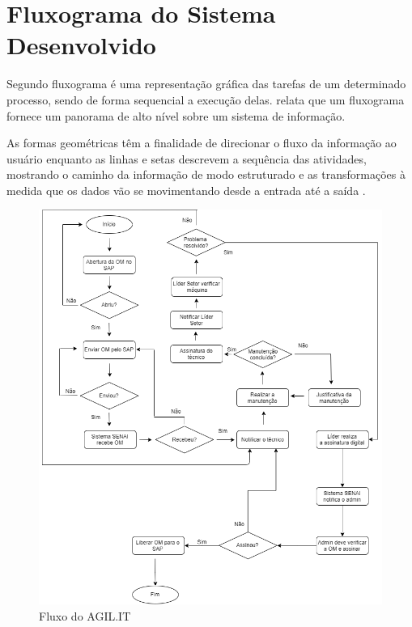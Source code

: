 \section{Fluxograma do Sistema Desenvolvido}

Segundo \cite{pejeronimo2002} fluxograma é uma representação gráfica das tarefas de um determinado processo, sendo de forma sequencial a execução delas. \cite{roberthurt} relata que um fluxograma fornece um panorama de alto nível sobre um sistema de informação.

As formas geométricas têm a finalidade de direcionar o fluxo da informação ao usuário enquanto as linhas e setas descrevem a sequência das atividades, mostrando o caminho da informação de modo estruturado e as transformações à medida que os dados vão se movimentando desde a entrada até a saída \cite{souza2017desenvolvimento}.

\begin{figure}[H]
	\caption{\label{flux_sys}Fluxo do AGIL.IT}
	\begin{center}
		\includegraphics[scale=0.55]{./Figuras/fluxo-sistema.png}
	\end{center}
\end{figure}

